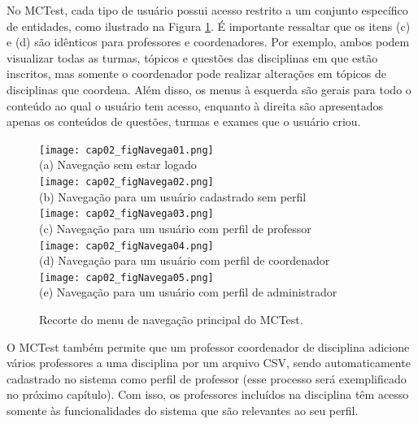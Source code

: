 No MCTest, cada tipo de usuário possui acesso restrito a um conjunto específico de entidades, como ilustrado na Figura \ref{fig:cap2_navegacao}. É importante ressaltar que os itens (c) e (d) são idênticos para professores e coordenadores. Por exemplo, ambos podem visualizar todas as turmas, tópicos e questões das disciplinas em que estão inscritos, mas somente o coordenador pode realizar alterações em tópicos de disciplinas que coordena. Além disso, os menus à esquerda são gerais para todo o conteúdo ao qual o usuário tem acesso, enquanto à direita são apresentados apenas os conteúdos de questões, turmas e exames que o usuário criou. 

\begin{figure}[!ht]
  \centering
  \texttt{[image: cap02\_figNavega01.png]} 
  \\ (a) Navegação sem estar logado \\ 
  \texttt{[image: cap02\_figNavega02.png]}
  \\ (b) Navegação para um usuário cadastrado sem perfil \\   
  \texttt{[image: cap02\_figNavega03.png]}
  \\ (c) Navegação para um usuário com perfil de professor \\ 
  \texttt{[image: cap02\_figNavega04.png]}
  \\ (d) Navegação para um usuário com perfil de coordenador \\ 
  \texttt{[image: cap02\_figNavega05.png]}
  \\ (e) Navegação para um usuário com perfil de administrador \\ 
  \caption{Recorte do menu de navegação principal do MCTest.}
  \label{fig:cap2_navegacao}
\end{figure}

O MCTest também permite que um professor coordenador de disciplina adicione vários professores a uma disciplina por um arquivo CSV, sendo automaticamente cadastrado no sistema como perfil de professor (esse processo será exemplificado no próximo capítulo). Com isso, os professores incluídos na disciplina têm acesso somente às funcionalidades do sistema que são relevantes ao seu perfil.



